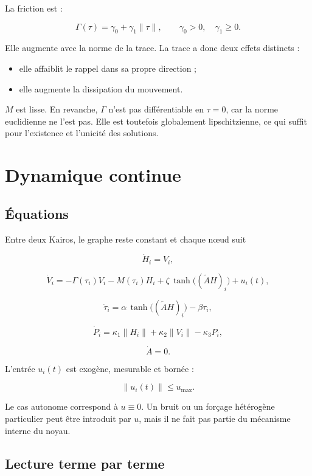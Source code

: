 La friction est :

\[
\Gamma(\tau)
=
\gamma_0+\gamma_1\|\tau\|,
\qquad
\gamma_0>0,
\quad
\gamma_1\geq 0.
\]

Elle augmente avec la norme de la trace. La trace a donc deux effets distincts :

\begin{itemize}
\tightlist
\item
  elle affaiblit le rappel dans sa propre direction ;
\item
  elle augmente la dissipation du mouvement.
\end{itemize}

\(M\) est lisse. En revanche, \(\Gamma\) n'est pas différentiable en \(\tau=0\), car la norme euclidienne ne l'est pas. Elle est toutefois globalement lipschitzienne, ce qui suffit pour l'existence et l'unicité des solutions.

\chapter{Dynamique continue}\label{t1-dynamique-continue}

\section{Équations}\label{t1-equations}

Entre deux Kairos, le graphe reste constant et chaque nœud suit

\[
\dot H_i=V_i,
\]

\[
\dot V_i
=
-\Gamma(\tau_i)V_i
-
M(\tau_i)H_i
+
\zeta\,\tanh\!\bigl((\widetilde A H)_i\bigr)
+
u_i(t),
\]

\[
\dot\tau_i
=
\alpha\,\tanh\!\bigl((\widetilde A H)_i\bigr)
-
\beta\tau_i,
\]

\[
\dot P_i
=
\kappa_1\|H_i\|
+
\kappa_2\|V_i\|
-
\kappa_3P_i,
\]

\[
\dot A=0.
\]

L'entrée \(u_i(t)\) est exogène, mesurable et bornée :

\[
\|u_i(t)\|\leq u_{\max}.
\]

Le cas autonome correspond à \(u\equiv 0\). Un bruit ou un forçage hétérogène particulier peut être introduit par \(u\), mais il ne fait pas partie du mécanisme interne du noyau.

\section{Lecture terme par terme}\label{t1-lecture-terme-par-terme}


